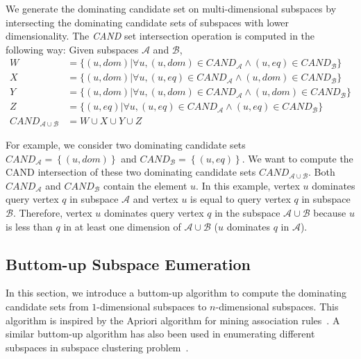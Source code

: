 We generate the dominating candidate set on multi-dimensional subspaces by intersecting the dominating candidate sets of subspaces with lower dimensionality. The \emph{CAND} set intersection operation is computed in the following way:
Given subspaces $\mathcal{A}$ and $\mathcal{B}$,
\begin{align*} 
\label{cmpt:intersection}
W &= \{(u, dom) |\forall u, (u, dom)\in \mathit{CAND}_\mathcal{A} \wedge (u, eq)\in \mathit{CAND}_\mathcal{B} \} \\
X &= \{(u, dom) |\forall u, (u, eq)\in \mathit{CAND}_\mathcal{A} \wedge (u, dom)\in \mathit{CAND}_\mathcal{B} \} \\
Y &= \{(u, dom) |\forall u, (u, dom)\in \mathit{CAND}_\mathcal{A} \wedge (u, dom)\in \mathit{CAND}_\mathcal{B}\} \\
Z &= \{(u, eq) |\forall u, (u, eq)\in \mathit{CAND}_\mathcal{A} \wedge (u, eq)\in \mathit{CAND}_\mathcal{B} \} \\
\mathit{CAND}_{\mathcal{A} \cup \mathcal{B}} &= W \cup X \cup Y \cup Z
\end{align*}

For example, we consider two dominating candidate sets $\mathit{CAND}_\mathcal{A} = \left\{(u, dom)\right\}$ and $\mathit{CAND}_\mathcal{B} = \left\{(u, eq)\right\}$. We want to compute the CAND intersection of these two dominating candidate sets $\mathit{CAND}_{\mathcal{A} \cup \mathcal{B}}$. 
Both $\mathit{CAND}_\mathcal{A}$ and $\mathit{CAND}_\mathcal{B}$ contain the element $u$. In this example, vertex $u$ dominates query vertex $q$ in subspace $\mathcal{A}$ and vertex $u$ is equal to query vertex $q$ in subspace $\mathcal{B}$. 
Therefore, vertex $u$ dominates query vertex $q$ in the subspace $\mathcal{A} \cup \mathcal{B}$ because $u$ is less than $q$ in at least one dimension of $\mathcal{A} \cup \mathcal{B}$ ($u$ dominates $q$ in $\mathcal{A}$). 


\subsection{Buttom-up Subspace Eumeration}

In this section, we introduce a buttom-up algorithm to compute the dominating candidate sets from $1$-dimensional subspaces to $n$-dimensional subspaces.
This algorithm is inspired by the Apriori algorithm for mining association rules~\cite{agrawal1996fast}. A similar buttom-up algorithm has also been used in enumerating different subspaces in subspace clustering problem~\cite{agrawal1998automatic}.

